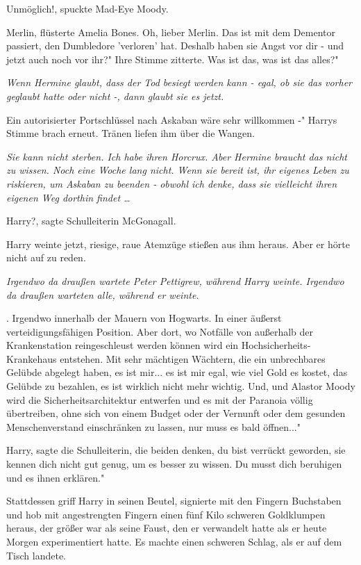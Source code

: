 \glqq Unmöglich!\grqq{}, spuckte Mad-Eye Moody.

\glqq Merlin\grqq{}, flüsterte Amelia Bones. \glqq Oh, lieber Merlin. Das ist
mit dem Dementor passiert, den Dumbledore 'verloren' hat. Deshalb haben sie
Angst vor dir - und jetzt auch noch vor ihr?" Ihre Stimme zitterte. \glqq Was
ist das, was ist das alles?"

\emph{Wenn Hermine glaubt, dass der Tod besiegt werden kann - egal, ob sie das vorher geglaubt hatte oder nicht -, dann glaubt sie es jetzt.}

\glqq Ein autorisierter Portschlüssel nach Askaban wäre sehr willkommen -"
Harrys Stimme brach erneut. Tränen liefen ihm über die Wangen.

\emph{Sie kann nicht sterben. Ich habe ihren Horcrux. Aber Hermine braucht das nicht zu wissen. Noch eine Woche lang nicht. Wenn sie bereit ist, ihr eigenes Leben zu riskieren, um Askaban zu beenden - obwohl ich denke, dass sie vielleicht ihren eigenen Weg dorthin findet …}

Harry?\grqq{}, sagte Schulleiterin McGonagall.

Harry weinte jetzt, riesige, raue Atemzüge stießen aus ihm heraus. Aber er hörte
nicht auf zu reden.

\emph{Irgendwo da draußen wartete Peter Pettigrew, während Harry weinte. Irgendwo da draußen warteten alle, während er weinte.}

. Irgendwo innerhalb der Mauern von Hogwarts. In einer äußerst
verteidigungsfähigen Position. Aber dort, wo Notfälle von außerhalb der
Krankenstation reingeschleust werden können wird ein Hochsicherheits-Krankehaus
entstehen. Mit sehr mächtigen Wächtern, die ein unbrechbares Gelübde abgelegt
haben, es ist mir... es ist mir egal, wie viel Gold es kostet, das Gelübde zu
bezahlen, es ist wirklich nicht mehr wichtig. Und, und Alastor Moody wird die
Sicherheitsarchitektur entwerfen und es mit der Paranoia völlig übertreiben,
ohne sich von einem Budget oder der Vernunft oder dem gesunden Menschenverstand
einschränken zu lassen, nur muss es bald öffnen..."

\glqq Harry\grqq{}, sagte die Schulleiterin, \glqq die beiden denken, du bist
verrückt geworden, sie kennen dich nicht gut genug, um es besser zu wissen. Du
musst dich beruhigen und es ihnen erklären."

Stattdessen griff Harry in seinen Beutel, signierte mit den Fingern Buchstaben
und hob mit angestrengten Fingern einen fünf Kilo schweren Goldklumpen heraus,
der größer war als seine Faust, den er verwandelt hatte als er heute Morgen
experimentiert hatte. Es machte einen schweren Schlag, als er auf dem Tisch
landete.

